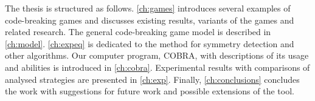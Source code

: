 The thesis is structured as follows.
\autoref{ch:games} introduces several examples of code-breaking games and
  discusses existing results, variants of the games and related research.
The general code-breaking game model is described in \autoref{ch:model}.
\autoref{ch:expeq} is dedicated to the method for symmetry detection and other algorithms.
Our computer program, COBRA, with descriptions of its usage and
  abilities is introduced in \autoref{ch:cobra}.
Experimental results with comparisons of analysed strategies
  are presented in \autoref{ch:exp}.
Finally, \autoref{ch:conclusions} concludes the work with suggestions for future work
  and possible extensions of the tool.






